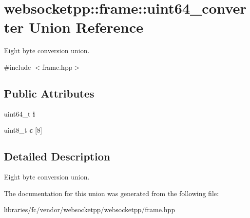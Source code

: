 \hypertarget{unionwebsocketpp_1_1frame_1_1uint64__converter}{}\section{websocketpp\+:\+:frame\+:\+:uint64\+\_\+converter Union Reference}
\label{unionwebsocketpp_1_1frame_1_1uint64__converter}


Eight byte conversion union.  




{\ttfamily \#include $<$frame.\+hpp$>$}

\subsection*{Public Attributes}
\begin{DoxyCompactItemize}
\item 
\mbox{\label{unionwebsocketpp_1_1frame_1_1uint64__converter_a5440031a82ed910e25f6d75c59ab0a88}} 
uint64\+\_\+t {\bfseries i}
\item 
\mbox{\label{unionwebsocketpp_1_1frame_1_1uint64__converter_a9d9e78c8c89d1eff191debf97f067731}} 
uint8\+\_\+t {\bfseries c} \mbox{[}8\mbox{]}
\end{DoxyCompactItemize}


\subsection{Detailed Description}
Eight byte conversion union. 

The documentation for this union was generated from the following file\+:\begin{DoxyCompactItemize}
\item 
libraries/fc/vendor/websocketpp/websocketpp/frame.\+hpp\end{DoxyCompactItemize}
